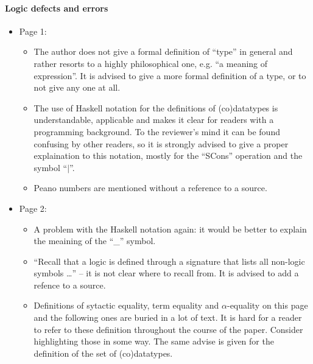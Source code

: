 \paragraph{Logic defects and errors}
\begin{itemize}
	\item Page 1:
	\begin{itemize}
		\item The author does not give a formal definition of ``type'' in general and rather resorts to a highly philosophical one, e.g. ``a meaning of expression''. It is advised to give a more formal definition of a type, or to not give any one at all.
		\item The use of Haskell notation for the definitions of (co)datatypes is understandable, applicable and makes it clear for readers with a programming background. To the reviewer's mind it can be found confusing by other readers, so it is strongly advised to give a proper explaination to this notation, mostly for the ``SCons'' operation and the symbol ``$|$''.
		\item Peano numbers are mentioned without a reference to a source.
	\end{itemize} 

	\item Page 2:
	\begin{itemize}
		\item A problem with the Haskell notation again: it would be better to explain the meaining of the ``\_'' symbol.
		\item ``Recall that a logic is deﬁned through a signature that lists all non-logic symbols \dots'' -- it is not clear where to recall from. It is advised to add a refence to a source.
		\item Definitions of sytactic equality, term equality and $\alpha$-equality on this page and the following ones are buried in a lot of text. It is hard for a reader to refer to these definition throughout the course of the paper. Consider highlighting those in some way. The same advise is given for the definition of the set of (co)datatypes.
	\end{itemize}


\end{itemize}
